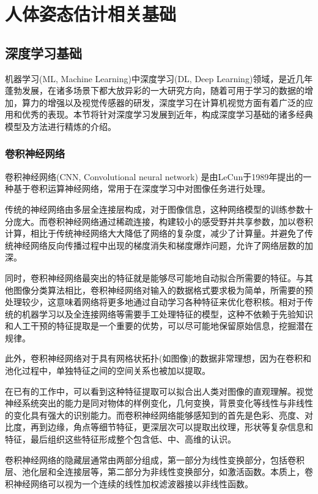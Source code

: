 
\chapter{人体姿态估计相关基础}


\section{深度学习基础}
\esection{}

机器学习(ML, Machine Learning)中深度学习(DL, Deep Learning)领域，是近几年蓬勃发展，在诸多场景下都大放异彩的一大研究方向，随着可用于学习的数据的增加，算力的增强以及视觉传感器的研发，深度学习在计算机视觉方面有着广泛的应用和优秀的表现。本节将针对深度学习发展到近年，构成深度学习基础的诸多经典模型及方法进行精炼的介绍。



\subsection{卷积神经网络}{}

卷积神经网络(CNN, Convolutional neural network) 是由LeCun于1989年提出的一种基于卷积运算神经网络，常用于在深度学习中对图像任务进行处理。

传统的神经网络由多层全连接层构成，对于图像信息，这种网络模型的训练参数十分庞大。而卷积神经网络通过稀疏连接，构建较小的感受野并共享参数，加以卷积计算，相比于传统神经网络大大降低了网络的复杂度，减少了计算量。并避免了传统神经网络反向传播过程中出现的梯度消失和梯度爆炸问题，允许了网络层数的加深。

同时，卷积神经网络最突出的特征就是能够尽可能地自动拟合所需要的特征。与其他图像分类算法相比，卷积神经网络对输入的数据格式要求极为简单，所需要的预处理较少，这意味着网络将更多地通过自动学习各种特征来优化卷积核。相对于传统的机器学习以及全连接网络等需要手工处理特征的模型，这种不依赖于先验知识和人工干预的特征提取是一个重要的优势，可以尽可能地保留原始信息，挖掘潜在规律。

此外，卷积神经网络对于具有网格状拓扑(如图像)的数据非常理想，因为在卷积和池化过程中，单独特征之间的空间关系也被加以提取。

在已有的工作中，可以看到这种特征提取可以拟合出人类对图像的直观理解。视觉神经系统突出的能力是同对物体的样例变化，几何变换，背景变化等线性与非线性的变化具有强大的识别能力。而卷积神经网络能够感知到的首先是色彩、亮度、对比度，再到边缘，角点等细节特征，更深层次可以提取出纹理，形状等复杂信息和特征，最后组织这些特征形成整个包含低、中、高维的认识。

卷积神经网络的隐藏层通常由两部分组成，第一部分为线性变换部分，包括卷积层、池化层和全连接层等，第二部分为非线性变换部分，如激活函数。本质上，卷积神经网络可以视为一个连续的线性加权滤波器接以非线性函数。

